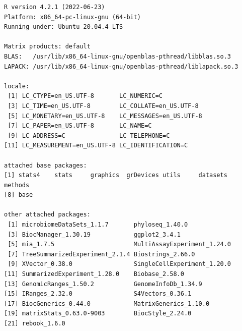 \documentclass[
]{book}
\begin{document}
\begin{verbatim}
R version 4.2.1 (2022-06-23)
Platform: x86_64-pc-linux-gnu (64-bit)
Running under: Ubuntu 20.04.4 LTS

Matrix products: default
BLAS:   /usr/lib/x86_64-linux-gnu/openblas-pthread/libblas.so.3
LAPACK: /usr/lib/x86_64-linux-gnu/openblas-pthread/liblapack.so.3

locale:
 [1] LC_CTYPE=en_US.UTF-8       LC_NUMERIC=C              
 [3] LC_TIME=en_US.UTF-8        LC_COLLATE=en_US.UTF-8    
 [5] LC_MONETARY=en_US.UTF-8    LC_MESSAGES=en_US.UTF-8   
 [7] LC_PAPER=en_US.UTF-8       LC_NAME=C                 
 [9] LC_ADDRESS=C               LC_TELEPHONE=C            
[11] LC_MEASUREMENT=en_US.UTF-8 LC_IDENTIFICATION=C       

attached base packages:
[1] stats4    stats     graphics  grDevices utils     datasets  methods  
[8] base     

other attached packages:
 [1] microbiomeDataSets_1.1.7       phyloseq_1.40.0               
 [3] BiocManager_1.30.19            ggplot2_3.4.1                 
 [5] mia_1.7.5                      MultiAssayExperiment_1.24.0   
 [7] TreeSummarizedExperiment_2.1.4 Biostrings_2.66.0             
 [9] XVector_0.38.0                 SingleCellExperiment_1.20.0   
[11] SummarizedExperiment_1.28.0    Biobase_2.58.0                
[13] GenomicRanges_1.50.2           GenomeInfoDb_1.34.9           
[15] IRanges_2.32.0                 S4Vectors_0.36.1              
[17] BiocGenerics_0.44.0            MatrixGenerics_1.10.0         
[19] matrixStats_0.63.0-9003        BiocStyle_2.24.0              
[21] rebook_1.6.0                  


\end{verbatim}
\end{document}
